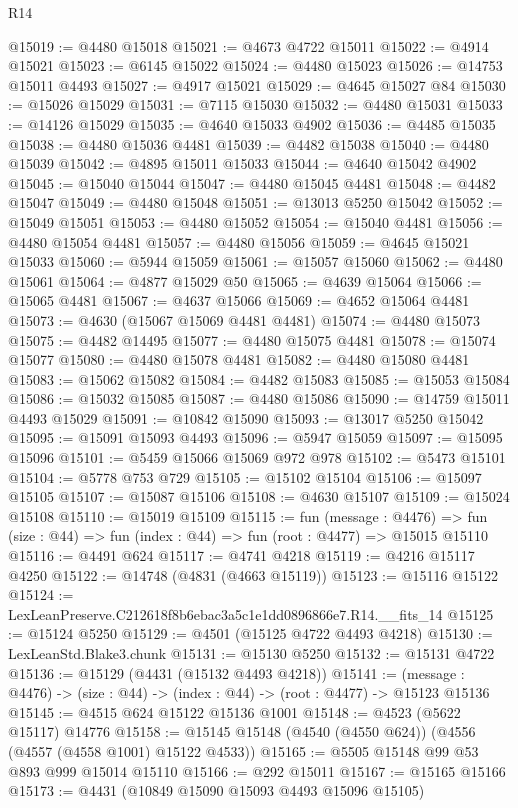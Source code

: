 \begin{lexlean}{R14}
\begin{coremodule}
@15019 := @4480 @15018
@15021 := @4673 @4722 @15011
@15022 := @4914 @15021
@15023 := @6145 @15022
@15024 := @4480 @15023
@15026 := @14753 @15011 @4493
@15027 := @4917 @15021
@15029 := @4645 @15027 @84
@15030 := @15026 @15029
@15031 := @7115 @15030
@15032 := @4480 @15031
@15033 := @14126 @15029
@15035 := @4640 @15033 @4902
@15036 := @4485 @15035
@15038 := @4480 @15036 @4481
@15039 := @4482 @15038
@15040 := @4480 @15039
@15042 := @4895 @15011 @15033
@15044 := @4640 @15042 @4902
@15045 := @15040 @15044
@15047 := @4480 @15045 @4481
@15048 := @4482 @15047
@15049 := @4480 @15048
@15051 := @13013 @5250 @15042
@15052 := @15049 @15051
@15053 := @4480 @15052
@15054 := @15040 @4481
@15056 := @4480 @15054 @4481
@15057 := @4480 @15056
@15059 := @4645 @15021 @15033
@15060 := @5944 @15059
@15061 := @15057 @15060
@15062 := @4480 @15061
@15064 := @4877 @15029 @50
@15065 := @4639 @15064
@15066 := @15065 @4481
@15067 := @4637 @15066
@15069 := @4652 @15064 @4481
@15073 := @4630 (@15067 @15069 @4481 @4481)
@15074 := @4480 @15073
@15075 := @4482 @14495
@15077 := @4480 @15075 @4481
@15078 := @15074 @15077
@15080 := @4480 @15078 @4481
@15082 := @4480 @15080 @4481
@15083 := @15062 @15082
@15084 := @4482 @15083
@15085 := @15053 @15084
@15086 := @15032 @15085
@15087 := @4480 @15086
@15090 := @14759 @15011 @4493 @15029
@15091 := @10842 @15090
@15093 := @13017 @5250 @15042
@15095 := @15091 @15093 @4493
@15096 := @5947 @15059
@15097 := @15095 @15096
@15101 := @5459 @15066 @15069 @972 @978
@15102 := @5473 @15101
@15104 := @5778 @753 @729
@15105 := @15102 @15104
@15106 := @15097 @15105
@15107 := @15087 @15106
@15108 := @4630 @15107
@15109 := @15024 @15108
@15110 := @15019 @15109
@15115 := fun (message : @4476) =>
  fun (size : @44) => fun (index : @44) => fun (root : @4477) => @15015 @15110
@15116 := @4491 @624
@15117 := @4741 @4218
@15119 := @4216 @15117 @4250
@15122 := @14748 (@4831 (@4663 @15119))
@15123 := @15116 @15122
@15124 := LexLeanPreserve.C212618f8b6ebac3a5c1e1dd0896866e7.R14.__fits_14
@15125 := @15124 @5250
@15129 := @4501 (@15125 @4722 @4493 @4218)
@15130 := LexLeanStd.Blake3.chunk
@15131 := @15130 @5250
@15132 := @15131 @4722
@15136 := @15129 (@4431 (@15132 @4493 @4218))
@15141 := (message : @4476) -> (size : @44) -> (index : @44) -> (root : @4477) -> @15123 @15136
@15145 := @4515 @624 @15122 @15136 @1001
@15148 := @4523 (@5622 @15117) @14776
@15158 := @15145 @15148 (@4540 (@4550 @624)) (@4556 (@4557 (@4558 @1001) @15122 @4533))
@15165 := @5505 @15148 @99 @53 @893 @999 @15014 @15110
@15166 := @292 @15011
@15167 := @15165 @15166
@15173 := @4431 (@10849 @15090 @15093 @4493 @15096 @15105)

\end{coremodule}
\end{lexlean}
